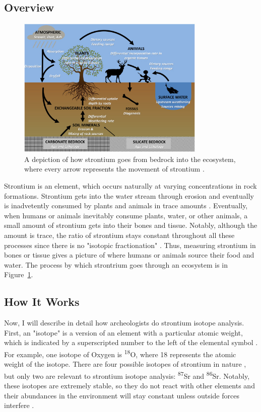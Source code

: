 \documentclass[a4paper, 12pt]{article}
\begin{document}
\subsection{Overview}
\begin{figure}[htbp]
    \centering
    \includegraphics[width=0.8\textwidth]{strontium_process.jpg}
    \caption{A depiction of how strontium goes from bedrock into the ecosystem, where every arrow
        represents the movement of strontium \citep{bataille2020}.}
    \label{fig:strontium_process}
\end{figure}

Strontium is an element, which occurs naturally at varying concentrations in rock formations.
Strontium gets into the water stream through erosion and eventually is inadvetently consumed by plants and animals in trace amounts \citep{bartelink2019}.
Eventually, when humans or animals inevitably consume plants, water, or other animals,
a small amount of strontium gets into their bones and tissue. Notably, although the amount is trace, the
ratio of strontium stays constant throughout all these processes since there is no "isotopic fractionation" \citep{bartelink2019}.
Thus, measuring strontium in bones or tissue gives a picture of where humans or animals source their food and water.
The process by which strontrium goes through an ecosystem is in Figure~\ref{fig:strontium_process}.


\subsection{How It Works}

Now, I will describe in detail how archeologists do strontium isotope analysis.
First, an "isotope" is a version of an element with a particular atomic weight,
which is indicated by a superscripted number to the left of the elemental symbol \citep{Meave60_2015}.
For example, one isotope of Oxygen is \textsuperscript{18}O, where 18 represents
the atomic weight of the isotope. There are four possible isotopes of strontium in
nature \citep{holt2021}, but only two are relevant to strontium isotope analysis: \textsuperscript{87}Sr and \textsuperscript{86}Sr.
Notably, these isotopes are extremely stable, so they do not react with other elements
and their abundances in the environment will stay constant unless outside forces interfere \citep{Long1998}.
\end{document}
